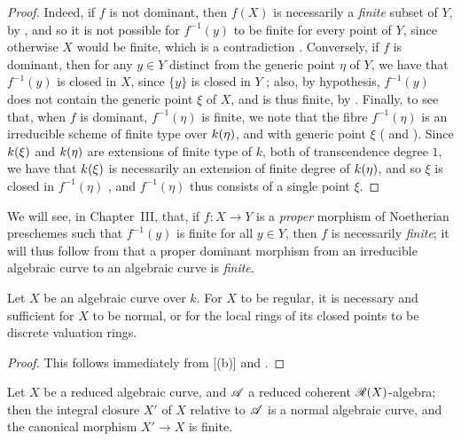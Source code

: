 \begin{proof}
Indeed, if $f$ is not dominant, then $f(X)$ is necessarily a \emph{finite} subset of $Y$, by , and so it is not possible for $f^{-1}(y)$ to be finite for every point of $Y$, since otherwise $X$ would be finite, which is a contradiction .
Conversely, if $f$ is dominant, then for any $y\in Y$ distinct from the generic point $\eta$ of $Y$, we have that $f^{-1}(y)$ is closed in $X$, since $\{y\}$ is closed in $Y$ ;
also, by hypothesis, $f^{-1}(y)$ does not contain the generic point $\xi$ of $X$, and is thus finite, by .
Finally, to see that, when $f$ is dominant, $f^{-1}(\eta)$ is finite, we note that the fibre $f^{-1}(\eta)$ is an irreducible scheme of finite type over $k(\eta)$, and with generic point $\xi$ ( and ).
Since $k(\xi)$ and $k(\eta)$ are extensions of finite type of $k$, both of transcendence degree $1$, we have that $k(\xi)$ is necessarily an extension of finite degree of $k(\eta)$, and so $\xi$ is closed in $f^{-1}(\eta)$ , and $f^{-1}(\eta)$ thus consists of a single point $\xi$.
\end{proof}

We will see, in Chapter~III, that, if $f:X\to Y$ is a \emph{proper} morphism of Noetherian preschemes such that $f^{-1}(y)$ is finite for all $y\in Y$, then $f$ is necessarily \emph{finite};
it will thus follow from  that a proper dominant morphism from an irreducible algebraic curve to an algebraic curve is \emph{finite}.

\begin{corollary}[7.4.5]
\label{II.7.4.5}
Let $X$ be an algebraic curve over $k$.
For $X$ to be regular, it is necessary and sufficient for $X$ to be normal, or for the local rings of its closed points to be discrete valuation rings.
\end{corollary}

\begin{proof}
This follows immediately from [(b)] and .
\end{proof}

\begin{corollary}[7.4.6]
\label{II.7.4.6}
Let $X$ be a reduced algebraic curve, and $\mathscr{A}$ a reduced coherent $\mathscr{R}(X)$-algebra;
then the integral closure $X'$ of $X$ relative to $\mathscr{A}$  is a normal algebraic curve, and the canonical morphism $X'\to X$ is finite.
\end{corollary}

